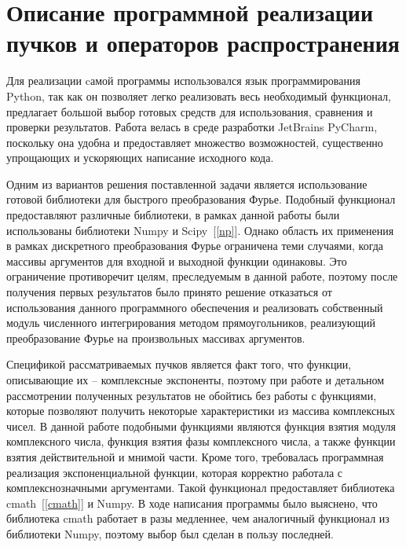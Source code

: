     \section[Описание программной реализации пучков и операторов распространения]{\nohyphens{Описание программной реализации пучков и операторов распространения}}
    {

    \vspace{-0.2cm}
    Для реализации cамой программы использовался язык
    программирования Python, так как он позволяет легко реализовать весь
    необходимый функционал, предлагает большой выбор готовых средств для
    использования, сравнения и проверки результатов. Работа велась в среде
    разработки JetBrains PyCharm, поскольку она удобна и предоставляет
    множество возможностей, существенно упрощающих и ускоряющих написание
    исходного кода.

    Одним из вариантов решения поставленной задачи является использование готовой библиотеки для
    быстрого преобразования Фурье. Подобный функционал предоставляют
    различные библиотеки, в рамках данной работы были использованы
    библиотеки Numpy и Scipy~[\ref{np}]. Однако область их применения в рамках
    дискретного преобразования Фурье ограничена теми случаями, когда массивы
    аргументов для входной и выходной функции одинаковы.
    Это ограничение противоречит целям, преследуемым в данной работе, поэтому после получения
    первых результатов было принято решение отказаться от использования
    данного программного обеспечения и реализовать собственный модуль
    численного интегрирования методом прямоугольников, реализующий
    преобразование Фурье на произвольных массивах аргументов.

    Спецификой рассматриваемых пучков является факт того, что функции,
    описывающие их – комплексные экспоненты, поэтому при работе и детальном
    рассмотрении полученных результатов не обойтись без работы с функциями,
    которые позволяют получить некоторые характеристики из массива
    комплексных чисел. В данной работе подобными функциями являются
    функция взятия модуля комплексного числа, функция взятия фазы
    комплексного числа, а также функции взятия действительной и мнимой части.
    Кроме того, требовалась программная реализация экспоненциальной функции,
    которая корректно работала с комплекснозначными аргументами.
    Такой функционал предоставляет библиотека cmath~[\ref{cmath}] и Numpy.
    В ходе написания программы было выяснено, что библиотека cmath работает в разы медленнее,
     чем аналогичный функционал из библиотеки Numpy, поэтому выбор был сделан в пользу последней.


}
